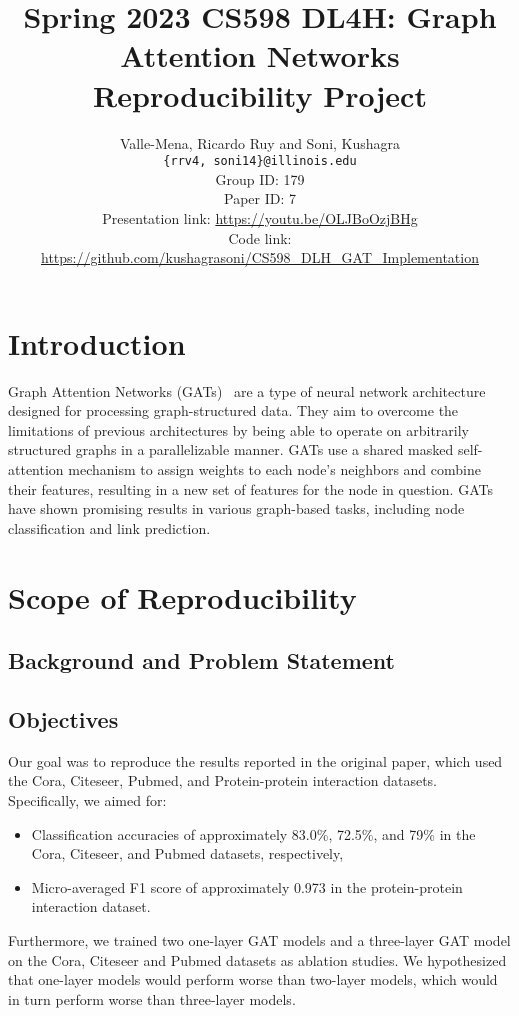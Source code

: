 \documentclass{article}
\title{Spring 2023 CS598 DL4H: Graph Attention Networks Reproducibility Project}
\author
{Valle-Mena, Ricardo Ruy and Soni, Kushagra \\
    \texttt{\{rrv4, soni14\}@illinois.edu}
    \\[2em]
    Group ID: 179\\
    Paper ID: 7\\
    Presentation link: \url{https://youtu.be/OLJBoOzjBHg} \\
    Code link: \url{https://github.com/kushagrasoni/CS598_DLH_GAT_Implementation}
    \\[2em]
}
\begin{document}
    \maketitle
\section{Introduction}\label{sec:introduction}
    Graph Attention Networks (GATs)~\cite{velickovic2018graph} are a type of neural network architecture designed for
    processing graph-structured data.
    They aim to overcome the limitations of previous architectures by being able to operate on arbitrarily structured graphs in a parallelizable manner.
    GATs use a shared masked self-attention mechanism to assign weights to each node's neighbors and combine their features, resulting in a new set of features for the node in question.
    GATs have shown promising results in various graph-based tasks, including node classification and link prediction.

    \section{Scope of Reproducibility}\label{sec:scope-of-reproducibility}

    \subsection{Background and Problem Statement}\label{sec:background-and-problem-statement}
    

    \subsection{Objectives}\label{sec:objectives}
    Our goal was to reproduce the results reported in the original paper, which used the Cora, Citeseer, Pubmed, and Protein-protein interaction datasets.
    Specifically, we aimed for:
    \begin{itemize}
        \item Classification accuracies of approximately 83.0\%, 72.5\%, and 79\% in the Cora, Citeseer, and Pubmed
        datasets, respectively,
        \item Micro-averaged F1 score of approximately 0.973 in the protein-protein interaction dataset.
    \end{itemize}

    Furthermore, we trained two one-layer GAT models and a three-layer GAT
    model on the Cora, Citeseer and Pubmed datasets as ablation studies.  We
    hypothesized that one-layer models would perform worse than two-layer
    models, which would in turn perform worse than three-layer models.
\end{document}
